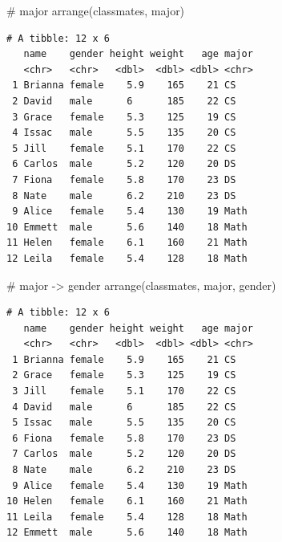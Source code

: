 \documentclass[
  letterpaper,
  DIV=11,
  numbers=noendperiod]{scrreprt}
\newenvironment{Shaded}{\begin{snugshade}}{\end{snugshade}}
\newcommand{\CommentTok}[1]{\textcolor[rgb]{0.37,0.37,0.37}{#1}}
\newcommand{\FunctionTok}[1]{\textcolor[rgb]{0.28,0.35,0.67}{#1}}
\newcommand{\NormalTok}[1]{\textcolor[rgb]{0.00,0.23,0.31}{#1}}
\begin{document}
\begin{tcolorbox}[enhanced jigsaw, colbacktitle=quarto-callout-tip-color!10!white, opacitybacktitle=0.6, breakable, left=2mm, leftrule=.75mm, toprule=.15mm, toptitle=1mm, bottomtitle=1mm, colframe=quarto-callout-tip-color-frame, opacityback=0, coltitle=black, arc=.35mm, titlerule=0mm, colback=white, bottomrule=.15mm, title=\textcolor{quarto-callout-tip-color}{\faLightbulb}\hspace{0.5em}{Answer}, rightrule=.15mm]

\begin{Shaded}
\begin{Highlighting}[]
\CommentTok{\# major}
\FunctionTok{arrange}\NormalTok{(classmates, major)}
\end{Highlighting}
\end{Shaded}

\begin{verbatim}
# A tibble: 12 x 6
   name    gender height weight   age major
   <chr>   <chr>   <dbl>  <dbl> <dbl> <chr>
 1 Brianna female    5.9    165    21 CS   
 2 David   male      6      185    22 CS   
 3 Grace   female    5.3    125    19 CS   
 4 Issac   male      5.5    135    20 CS   
 5 Jill    female    5.1    170    22 CS   
 6 Carlos  male      5.2    120    20 DS   
 7 Fiona   female    5.8    170    23 DS   
 8 Nate    male      6.2    210    23 DS   
 9 Alice   female    5.4    130    19 Math 
10 Emmett  male      5.6    140    18 Math 
11 Helen   female    6.1    160    21 Math 
12 Leila   female    5.4    128    18 Math 
\end{verbatim}

\begin{Shaded}
\begin{Highlighting}[]
\CommentTok{\# major {-}\textgreater{} gender}
\FunctionTok{arrange}\NormalTok{(classmates, major, gender)}
\end{Highlighting}
\end{Shaded}

\begin{verbatim}
# A tibble: 12 x 6
   name    gender height weight   age major
   <chr>   <chr>   <dbl>  <dbl> <dbl> <chr>
 1 Brianna female    5.9    165    21 CS   
 2 Grace   female    5.3    125    19 CS   
 3 Jill    female    5.1    170    22 CS   
 4 David   male      6      185    22 CS   
 5 Issac   male      5.5    135    20 CS   
 6 Fiona   female    5.8    170    23 DS   
 7 Carlos  male      5.2    120    20 DS   
 8 Nate    male      6.2    210    23 DS   
 9 Alice   female    5.4    130    19 Math 
10 Helen   female    6.1    160    21 Math 
11 Leila   female    5.4    128    18 Math 
12 Emmett  male      5.6    140    18 Math 
\end{verbatim}


\end{tcolorbox}
\end{document}
